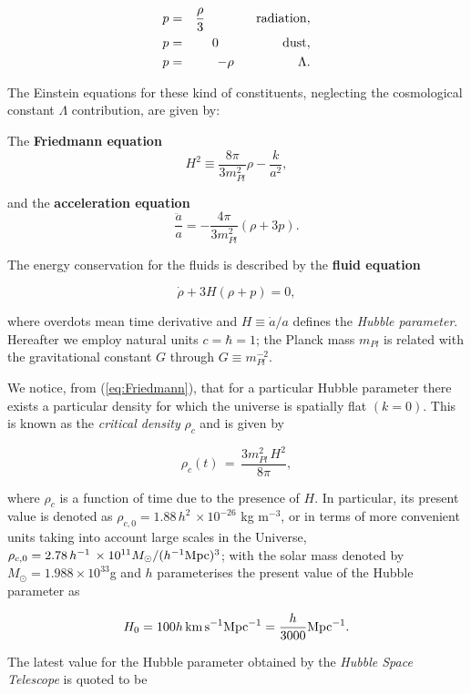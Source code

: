 \documentclass{rmaa}
\def\beq{\begin{equation}}
\def\eeq{\end{equation}}
\begin{document}
\begin{eqnarray}
p&=& \frac{\rho}{3} \qquad \qquad {\rm radiation}, \nonumber \\
p&=&0 \qquad \qquad \quad {\rm dust}, \\
p&=&-\rho \qquad \qquad \quad \Lambda. \nonumber
\end{eqnarray}

\noindent
The Einstein equations for these kind of constituents, neglecting the cosmological 
constant $\Lambda$ contribution, are given by:

\noindent
The {\bf Friedmann equation}
\beq\label{eq:Friedmann}
H^2  \equiv   \frac{8\pi}{3 m^2_{Pl}} \rho  - \frac{k}{a^2}, 
\eeq

\noindent
and the {\bf acceleration equation}
\beq \label{eq:Acce}
\frac{\ddot{a}}{a}  =   - \frac{4\pi }{3 m^2_{Pl}} (\rho +3p).
\eeq

\noindent
The energy conservation for the fluids is described by the {\bf fluid equation}

\begin{equation}
\dot \rho + 3H(\rho + p)=0,
\end{equation}

\noindent
where overdots mean time derivative and $H \equiv \dot a/a$ defines the \textit{Hubble parameter}. Hereafter we employ natural units
$c=\hbar=1$; the Planck mass $m_{Pl}$ is related with the gravitational constant $G$ through $G\equiv m^{-2}_{Pl}$.


We notice, from (\ref{eq:Friedmann}), that for a particular 
Hubble parameter there exists a particular density for which the universe is spatially flat 
$(k=0)$. This is known as the {\it critical density} $\rho_c$ and is given by

\beq
\rho_c(t)\, =\, \frac{3 m^2_{Pl} \,H^2}{8\pi},
\eeq

\noindent
where $\rho_c$ is a function of time due to the presence of $H$. In particular, its present 
value is denoted as $\rho_{c,0}=1.88\, h^2\, \times 10^{-26}$ kg m$^{-3}$, or in terms of more 
convenient units taking into account large scales in the 
Universe,   $\rho_{c,0}= 2.78 \, h^{-1}\, \times 10^{11} M_{\odot} /(h^{-1} {\rm Mpc})^3 $;
with the solar mass denoted by $M_{\odot}=1.988\times 10^{33}$g
 and $h$ parameterises the present value of the Hubble parameter as

\beq
H_0 = 100 h\, {\rm km\,s}^{-1}{\rm Mpc}^{-1} = \frac{h}{3000}{\rm Mpc}^{-1}.
\eeq

\noindent
The latest value for the Hubble parameter obtained by the \textit{Hubble Space Telescope}
is quoted to be \citep{Riess}
\end{document}
